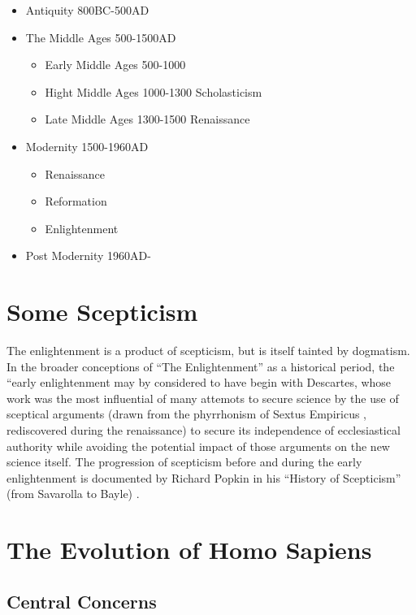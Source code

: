 \documentclass[10pt,titlepage]{article}
\begin{document}
\begin{itemize}
\item Antiquity 800BC-500AD
\item The Middle Ages 500-1500AD
    \begin{itemize}
  \item Early Middle Ages 500-1000
  \item Hight Middle Ages 1000-1300 Scholasticism
  \item Late Middle Ages 1300-1500 Renaissance    
    \end{itemize}
\item Modernity 1500-1960AD
  \begin{itemize}
  \item Renaissance
  \item Reformation
  \item Enlightenment    
    \end{itemize}
\item Post Modernity 1960AD- 
\end{itemize}


\section{Some Scepticism}

The enlightenment is a product of scepticism, but is itself tainted by dogmatism.
In the broader conceptions of ``The Enlightenment'' as a historical period, the ``early enlightenment may by considered to have begin with Descartes, whose work was the most influential of many attemots to secure science by the use of sceptical arguments (drawn from the phyrrhonism of Sextus Empiricus \cite{sextusempiricusOOP}, rediscovered during the renaissance) to secure its independence of ecclesiastical authority while avoiding the potential impact of those arguments on the new science itself.
The progression of scepticism before and during the early enlightenment is documented by Richard Popkin in his ``History of Scepticism'' (from Savarolla to Bayle) \cite{popkin03}.


\section{The Evolution of Homo Sapiens}



\subsection{Central Concerns}
\end{document}
